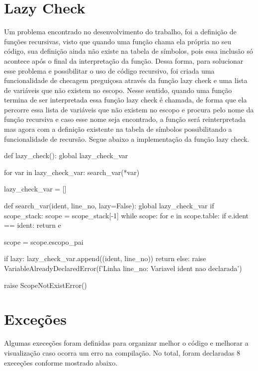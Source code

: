 \documentclass[
	12pt,				%
	openright,			%
	twoside,			%
	a4paper,			%
	english,			%
	french,				%
	spanish,			%
	brazil				%
	]{abntex2}
\begin{document}
\section{Lazy Check}
Um problema encontrado no desenvolvimento do trabalho, foi a definição de funções recursivas, visto que quando uma função chama ela própria no seu código, sua definição ainda não existe na tabela de símbolos, pois essa inclusão só acontece após o final da interpretação da função. Dessa forma, para solucionar esse problema e possibilitar o uso de código recursivo, foi criada uma funcionalidade de checagem preguiçosa através da função lazy check e uma lista de variáveis que não existem no escopo. Nesse sentido, quando uma função termina de ser interpretada essa função lazy check é chamada, de forma que ela percorre essa lista de variáveis que não existem no escopo e procura pelo nome da função recursiva e caso esse nome seja encontrado, a função será reinterpretada mas agora com a definição existente na tabela de símbolos possibilitando a funcionalidade de recursão.
Segue abaixo a implementação da função lazy check.

\begin{python}
def lazy_check():
    global lazy_check_var
  
    for var in lazy_check_var:
        search_var(*var)
  
    lazy_check_var = []

def search_var(ident, line_no, lazy=False):
    global lazy_check_var
    if scope_stack:
        scope = scope_stack[-1]
        while scope:
            for e in scope.table:
                if e.ident == ident:
                    return e
            
            scope = scope.escopo_pai
        
        if lazy:
            lazy_check_var.append((ident, line_no))
            return
        else:
            raise VariableAlreadyDeclaredError(f'Linha {line_no}: Variavel {ident} nao declarada')

    raise ScopeNotExistError()
\end{python}
\section{Exceções}
Algumas execeções foram definidas para organizar melhor o código
e melhorar a visualização caso ocorra um erro na compilação.
No total, foram declaradas 8 execeções conforme mostrado abaixo.
\end{document}
